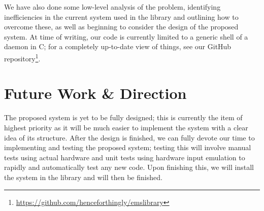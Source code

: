 \documentclass{article}
\begin{document}
We have also done some low-level analysis of the problem, identifying inefficiencies in the current system used in the library and outlining how to overcome these, as well as beginning to consider the design of the proposed system. At time of writing, our code is currently limited to a generic shell of a daemon in C; for a completely up-to-date view of things, see our GitHub repository\footnote{\url{https://github.com/henceforthingly/emslibrary}}.

\section{Future Work \& Direction}

The proposed system is yet to be fully designed; this is currently the item of highest priority as it will be much easier to implement the system with a clear idea of its structure. After the design is finished, we can fully devote our time to implementing and testing the proposed system; testing this will involve manual tests using actual hardware and unit tests using hardware input emulation to rapidly and automatically test any new code. Upon finishing this, we will install the system in the library and will then be finished.
\end{document}
